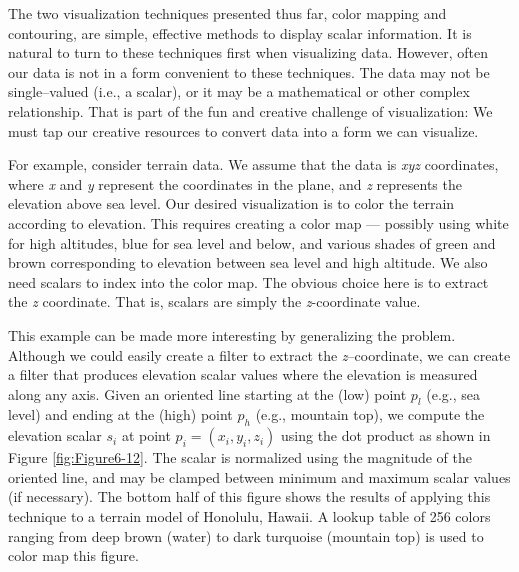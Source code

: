 The two visualization techniques presented thus far, color mapping and contouring, are simple, effective methods to display scalar information. It is natural to turn to these techniques first when visualizing data. However, often our data is not in a form convenient to these techniques. The data may not be single--valued (i.e., a scalar), or it may be a mathematical or other complex relationship. That is part of the fun and creative challenge of visualization: We must tap our creative resources to convert data into a form we can visualize.

For example, consider terrain data. We assume that the data is \emph{xyz} coordinates, where \emph{x} and \emph{y} represent the coordinates in the plane, and \emph{z} represents the elevation above sea level. Our desired visualization is to color the terrain according to elevation. This requires creating a color map --- possibly using white for high altitudes, blue for sea level and below, and various shades of green and brown corresponding to elevation between sea level and high altitude. We also need scalars to index into the color map. The obvious choice here is to extract the \emph{z} coordinate. That is, scalars are simply the \emph{z}-coordinate value.

This example can be made more interesting by generalizing the problem. Although we could easily create a filter to extract the \emph{z}--coordinate, we can create a filter that produces elevation scalar values where the elevation is measured along any axis. Given an oriented line starting at the (low) point $p_l$ (e.g., sea level) and ending at the (high) point $p_h$ (e.g., mountain top), we compute the elevation scalar $s_i$ at point $p_i = (x_i, y_i,z_i)$ using the dot product as shown in Figure \ref{fig:Figure6-12}. The scalar is normalized using the magnitude of the oriented line, and may be clamped between minimum and maximum scalar values (if necessary). The bottom half of this figure shows the results of applying this technique to a terrain model of Honolulu, Hawaii. A lookup table of 256 colors ranging from deep brown (water) to dark turquoise (mountain top) is used to color map this figure.


